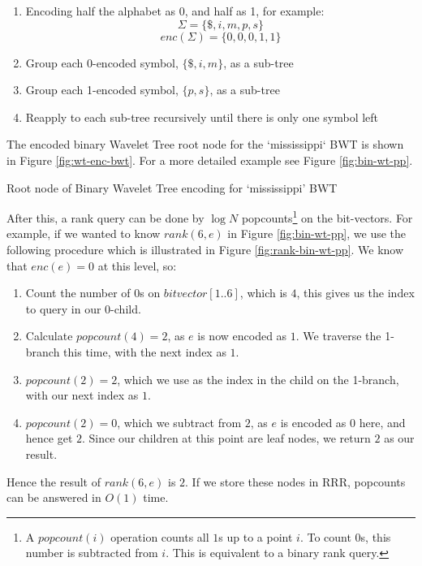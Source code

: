 \begin{enumerate}
    \item
		Encoding half the alphabet as 0, and half as 1, for example:
    		$$\Sigma = \{ \$, i, m, p, s \}$$
			$$enc(\Sigma) = \{ 0, 0, 0, 1, 1 \}$$
    \item
		Group each 0-encoded symbol, $\{ \$, i, m \}$, as a sub-tree
    \item
		Group each 1-encoded symbol, $\{ p, s \}$, as a sub-tree
    \item
		Reapply to each sub-tree recursively until there is only one symbol
    	left
\end{enumerate}

The encoded binary Wavelet Tree root node for the `mississippi` BWT is shown in Figure \ref{fig:wt-enc-bwt}. For a more detailed example see Figure \ref{fig:bin-wt-pp}.


			{Root node of Binary Wavelet Tree encoding for `mississippi' BWT}


After this, a rank query can be done by $\log N$ popcounts\footnote{A
$popcount(i)$ operation counts all $1$s up to a point $i$. To count $0$s, this
number is subtracted from $i$. This is equivalent to a binary rank query.} on 
the bit-vectors. For example, if we wanted to know $rank(6, e)$ in Figure 
\ref{fig:bin-wt-pp}, we use the following procedure which is illustrated in 
Figure \ref{fig:rank-bin-wt-pp}. 
We know that $enc(e) = 0$ at this level, so:

\begin{enumerate}
    \item
		Count the number of $0$s on $bitvector[1..6]$, which is $4$, this
   		gives us the index to query in our 0-child.
    \item
		Calculate $popcount(4) = 2$, as $e$ is now encoded as $1$. We traverse
    	the 1-branch this time, with the next index as $1$.
    \item
		$popcount(2) = 2$, which we use as the index in the child on the
    	1-branch, with our next index as $1$.
    \item
		$popcount(2) = 0$, which we subtract from $2$, as $e$ is encoded as
    	$0$ here, and hence get $2$. Since our children at this point are leaf
    	nodes, we return $2$ as our result.
\end{enumerate}

Hence the result of $rank(6, e)$ is $2$. If we store these nodes in RRR, 
popcounts can be answered in $O(1)$ time.

